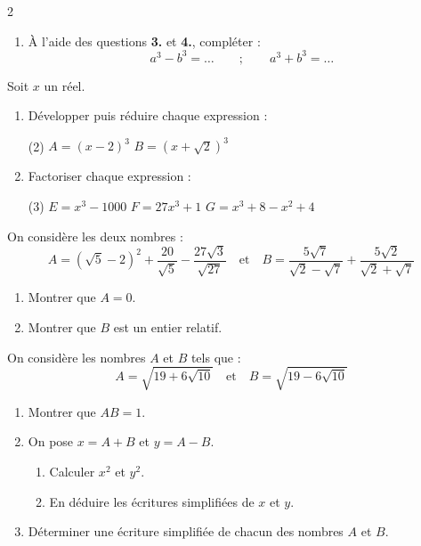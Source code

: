 \documentclass[10pt, a4paper]{article}
\begin{document}
\begin{multicols*}{2}
\begin{Activite}[][20 min]
\begin{enumerate}
    \item À l'aide des questions \textbf{3.} et \textbf{4.}, compléter :
    \[
        a^3 - b^3 = \dots \qquad ; \qquad a^3 + b^3 = \dots
    \]
\end{enumerate}
\end{Activite}

\begin{Application}[][20 min]
Soit $x$ un réel.
\begin{enumerate}
    \item Développer puis réduire chaque expression :
    \begin{tasks}[label=$\bullet$, label-width=5pt, item-indent=15pt](2)
        \task $A = (x - 2)^3$
        \task $B = (x + \sqrt{2})^3$
    \end{tasks}

    \item Factoriser chaque expression :
    \begin{tasks}[label=$\bullet$, label-width=5pt, item-indent=15pt](3)
        \task $E = x^3 - 1000$
        \task $F =  27x^3 + 1$
        \task $G = x^3 + 8 - x^2 + 4$
    \end{tasks}

\end{enumerate}
\end{Application}

\begin{Application}[][15 min]
On considère les deux nombres :
$$A = (\sqrt{5} - 2)^2 + \frac{20}{\sqrt{5}} - \frac{27\sqrt{3}}{\sqrt{27}} \quad \text{et} \quad
B = \frac{5\sqrt{7}}{\sqrt{2} - \sqrt{7}} + \frac{5\sqrt{2}}{\sqrt{2} + \sqrt{7}}$$
\begin{enumerate}
    \item Montrer que $A=0$.
    \item Montrer que $B$ est un entier relatif.
\end{enumerate}
\end{Application}

\begin{Application}[][20 min]
On considère les nombres $A$ et $B$ tels que :
$$A = \sqrt{19 + 6\sqrt{10}} \quad \text{et} \quad B = \sqrt{19 - 6\sqrt{10}}$$
\begin{enumerate}
\item Montrer que $AB = 1$.
\item On pose $x = A + B$ et $y = A - B$.
\begin{enumerate}
\item Calculer $x^2$ et $y^2$.
\item En déduire les écritures simplifiées de $x$ et $y$.
\end{enumerate}
\item Déterminer une écriture simplifiée de chacun des nombres $A$ et $B$.
\end{enumerate}
\end{Application}

\end{multicols*}
\end{document}
